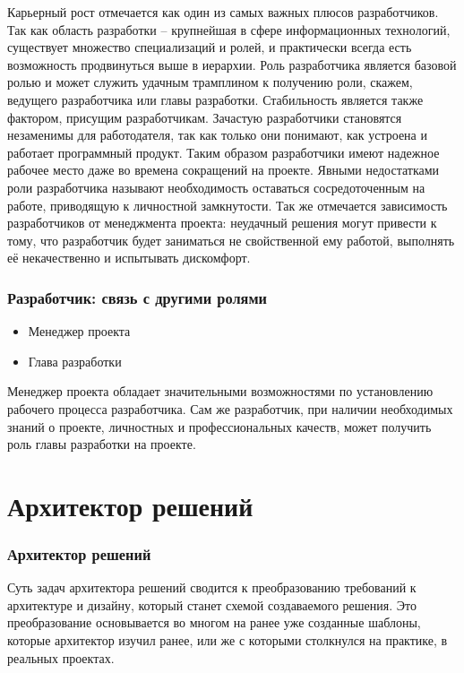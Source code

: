 \documentclass{../industrial-development}
\begin{document}
\lecturenotes

Карьерный рост отмечается как один из самых важных плюсов разработчиков. Так как область разработки – крупнейшая в сфере информационных технологий, существует множество специализаций и ролей, и практически всегда есть возможность продвинуться выше в иерархии. Роль разработчика является базовой ролью и может служить удачным трамплином к получению роли, скажем, ведущего разработчика или главы разработки.
Стабильность является также фактором, присущим разработчикам. Зачастую разработчики становятся незаменимы для работодателя, так как только они понимают, как устроена и работает программный продукт. Таким образом разработчики имеют надежное рабочее место даже во времена сокращений на проекте. 
Явными недостатками роли разработчика называют необходимость оставаться сосредоточенным на работе, приводящую к личностной замкнутости. Так же отмечается зависимость разработчиков от менеджмента проекта: неудачный решения могут привести к тому, что разработчик будет заниматься не свойственной ему работой, выполнять её некачественно и испытывать дискомфорт. 
  ~\cite{Anatomy}

\begin{frame} \frametitle{Разработчик: связь с другими ролями}
  \begin{itemize}
  \item Менеджер проекта
  \item Глава разработки
  \end{itemize}
  \begin{block}{}
	\alert{} Менеджер проекта обладает значительными возможностями по установлению рабочего процесса разработчика. Сам же разработчик, при наличии необходимых знаний о проекте, личностных и профессиональных качеств, может получить роль главы разработки на проекте.
	\end{block}
\end{frame}

\section{Архитектор решений }

\begin{frame} \frametitle{Архитектор решений}
	\begin{block}{}
		\alert {} Суть задач {архитектора решений} сводится к преобразованию требований к архитектуре и дизайну, который станет схемой создаваемого решения. Это преобразование основывается во многом на ранее уже созданные шаблоны, которые архитектор изучил ранее, или же с которыми столкнулся на практике, в реальных проектах. 
	\end{block}
\end{frame}
\end{document}
